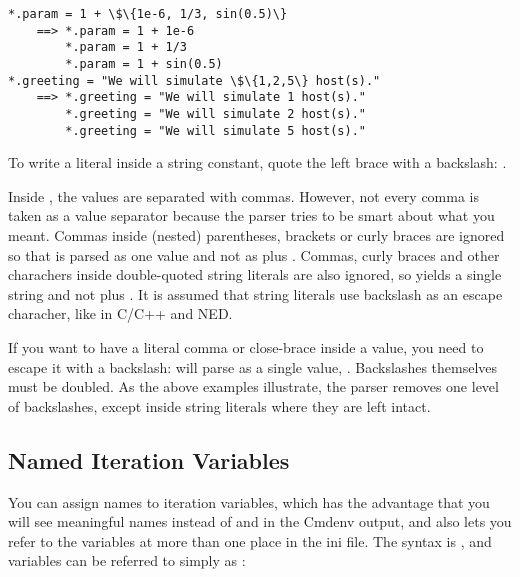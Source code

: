 \begin{Verbatim}[commandchars=\\\{\}]
*.param = 1 + \$\{1e-6, 1/3, sin(0.5)\}
    ==> *.param = 1 + 1e-6
        *.param = 1 + 1/3
        *.param = 1 + sin(0.5)
*.greeting = "We will simulate \$\{1,2,5\} host(s)."
    ==> *.greeting = "We will simulate 1 host(s)."
        *.greeting = "We will simulate 2 host(s)."
        *.greeting = "We will simulate 5 host(s)."
\end{Verbatim}

To write a literal  inside a string constant, quote
the left brace with a backslash: .

\begin{note}
Inside , the values are separated with commas. However,
not every comma is taken as a value separator because the parser
tries to be smart about what you meant. Commas inside (nested) parentheses,
brackets or curly braces are ignored so that  is
parsed as one value and not as  plus . Commas, curly
braces and other charachers inside double-quoted string literals are
also ignored, so  yields a single 
string and not  plus . It is assumed that string literals
use backslash as an escape characher, like in C/C++ and NED.

If you want to have a literal comma or close-brace inside a value, you need
to escape it with a backslash: 
will parse as a single value, . Backslashes themselves must be doubled.
As the above examples illustrate, the parser removes one level of backslashes,
except inside string literals where they are left intact.
\end{note}


\subsection{Named Iteration Variables}

You can assign names to iteration variables, which has the advantage
that you will see meaningful names instead of  and
 in the Cmdenv output, and also lets you refer to the variables at
more than one place in the ini file. The syntax is
, and variables can be referred to simply as
:


